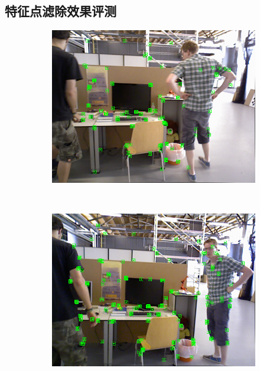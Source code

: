 \subsection{特征点滤除效果评测}
\begin{figure}[!htbp]
    \centering
    \begin{subfigure}[b]{0.35\textwidth}
      \includegraphics[width=\textwidth]{Img/orb_63.png}
      \caption{}
      \label{fig:orb_63}
    \end{subfigure}%
    ~%
    \begin{subfigure}[b]{0.35\textwidth}
      \includegraphics[width=\textwidth]{Img/orb_87.png}
      \caption{}
      \label{fig:orb_87}
    \end{subfigure}

\end{figure}
